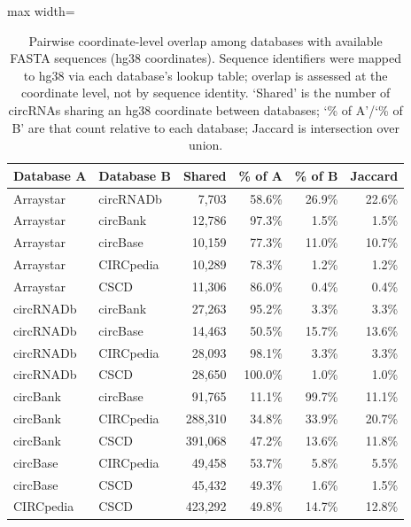 \begin{table}[ht]
  \centering
  \caption[Pairwise coordinate-level overlap among databases with available FASTA sequences (hg38 coordinates)]{Pairwise coordinate-level overlap among databases with available FASTA sequences (hg38 coordinates). Sequence identifiers were mapped to hg38 via each database's lookup table; overlap is assessed at the coordinate level, not by sequence identity. `Shared' is the number of circRNAs sharing an hg38 coordinate between databases; `\% of A'/`\% of B' are that count relative to each database; Jaccard is intersection over union.}
  \label{pycircsupptab5}
  \footnotesize
  \begin{adjustbox}{max width=\textwidth}
  \begin{tabular}{llrrrr}
    \toprule
    Database A & Database B & Shared & \% of A & \% of B & Jaccard \\
    \midrule
    Arraystar  & circRNADb & 7,703 & 58.6\% & 26.9\% & 22.6\% \\
    Arraystar  & circBank & 12,786 & 97.3\% & 1.5\% & 1.5\% \\
    Arraystar  & circBase & 10,159 & 77.3\% & 11.0\% & 10.7\% \\
    Arraystar  & CIRCpedia & 10,289 & 78.3\% & 1.2\% & 1.2\% \\
    Arraystar  & CSCD & 11,306 & 86.0\% & 0.4\% & 0.4\% \\
    circRNADb  & circBank & 27,263 & 95.2\% & 3.3\% & 3.3\% \\
    circRNADb  & circBase & 14,463 & 50.5\% & 15.7\% & 13.6\% \\
    circRNADb  & CIRCpedia & 28,093 & 98.1\% & 3.3\% & 3.3\% \\
    circRNADb  & CSCD & 28,650 & 100.0\% & 1.0\% & 1.0\% \\
    circBank   & circBase & 91,765 & 11.1\% & 99.7\% & 11.1\% \\
    circBank   & CIRCpedia & 288,310 & 34.8\% & 33.9\% & 20.7\% \\
    circBank   & CSCD & 391,068 & 47.2\% & 13.6\% & 11.8\% \\
    circBase   & CIRCpedia & 49,458 & 53.7\% & 5.8\% & 5.5\% \\
    circBase   & CSCD & 45,432 & 49.3\% & 1.6\% & 1.5\% \\
    CIRCpedia  & CSCD & 423,292 & 49.8\% & 14.7\% & 12.8\% \\
    \bottomrule
  \end{tabular}
  \end{adjustbox}
\end{table}

